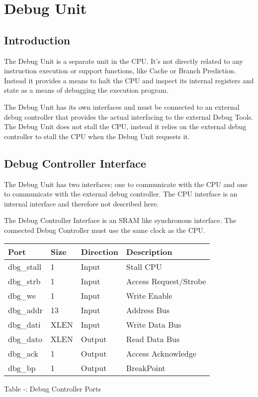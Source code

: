 \section{Debug Unit}\label{debug-unit-1}

\subsection{Introduction}\label{introduction-4}

The Debug Unit is a separate unit in the CPU. It's not directly related
to any instruction execution or support functions, like Cache or Branch
Prediction. Instead it provides a means to halt the CPU and inspect its
internal registers and state as a means of debugging the execution
program.

The Debug Unit has its own interfaces and must be connected to an
external debug controller that provides the actual interfacing to the
external Debug Tools. The Debug Unit does not stall the CPU, instead it
relies on the external debug controller to stall the CPU when the Debug
Unit requests it.

\subsection{Debug Controller Interface
}\label{debug-controller-interface}

The Debug Unit has two interfaces; one to communicate with the CPU and
one to communicate with the external debug controller. The CPU interface
is an internal interface and therefore not described here.

The Debug Controller Interface is an SRAM like synchronous interface.
The connected Debug Controller must use the same clock as the CPU.

\begin{longtable}[]{@{}llll@{}}
\toprule
Port & Size & Direction & Description\tabularnewline
\midrule
\endhead
dbg\_stall & 1 & Input & Stall CPU\tabularnewline
dbg\_strb & 1 & Input & Access Request/Strobe\tabularnewline
dbg\_we & 1 & Input & Write Enable\tabularnewline
dbg\_addr & 13 & Input & Address Bus\tabularnewline
dbg\_dati & XLEN & Input & Write Data Bus\tabularnewline
dbg\_dato & XLEN & Output & Read Data Bus\tabularnewline
dbg\_ack & 1 & Output & Access Acknowledge\tabularnewline
dbg\_bp & 1 & Output & BreakPoint\tabularnewline
\bottomrule
\end{longtable}

Table ‑: Debug Controller Ports

